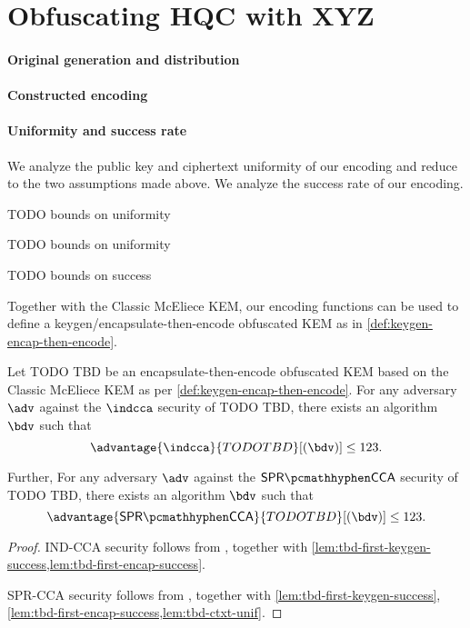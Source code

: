 \section{Obfuscating HQC with XYZ} \label{sec:tbd}
\paragraph{Original generation and distribution}
\paragraph{Constructed encoding}
\paragraph{Uniformity and success rate}

We analyze the public key and ciphertext uniformity of our encoding and reduce to the two assumptions made above. We analyze the success rate of our encoding.

\begin{lemma}
\label{lem:tbd-pk-unif}
    TODO bounds on uniformity
\end{lemma}

\begin{lemma}
\label{lem:tbd-ctxt-unif}
    TODO bounds on uniformity
\end{lemma}

\begin{lemma}[[First-encaps success probability of TODO TBD]
\label{lem:tbd-first-encap-success}
    TODO bounds on success
\end{lemma}

Together with the Classic McEliece KEM, our encoding functions can be used to define a keygen/encapsulate-then-encode obfuscated KEM as in \cref{def:keygen-encap-then-encode}.

\begin{theorem}
    Let TODO TBD be an encapsulate-then-encode obfuscated KEM based on the Classic McEliece KEM as per \cref{def:keygen-encap-then-encode}. For any adversary $\adv$ against the $\indcca$ security of TODO TBD, there exists an algorithm $\bdv$ such that
    \[ \advantage{\indcca}{TODO TBD}[(\bdv)] \leq 123. \]

    Further,  For any adversary $\adv$ against the $\sprcca$ security of TODO TBD, there exists an algorithm $\bdv$ such that
    \[ \advantage{\sprcca}{TODO TBD}[(\bdv)] \leq 123. \]
\end{theorem}
\begin{proof}
    IND-CCA security follows from \cite[Theorem~2.12]{CCS:GunSteVei24}, together with \cref{lem:tbd-first-keygen-success,lem:tbd-first-encap-success}.
    
    SPR-CCA security follows from \cite[Theorem~2.13]{CCS:GunSteVei24}, together with \cref{lem:tbd-first-keygen-success}, \ref{lem:tbd-first-encap-success,lem:tbd-ctxt-unif}.
\end{proof}
